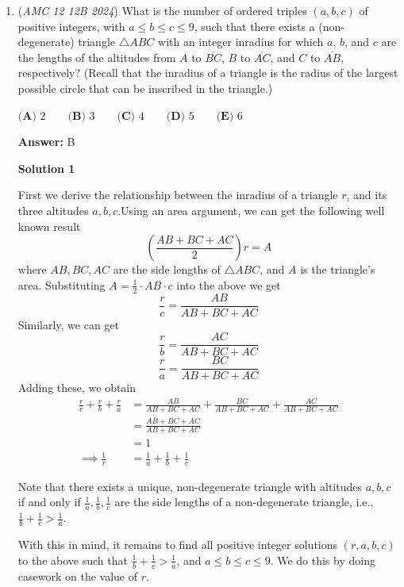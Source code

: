 \begin{enumerate}
 Yielding answer choice $\boxed{B}$.

 ==Only B and D looks normal , guess one using掐头去尾

 


	\item (\textit{AMC 12 12B 2024}) What is the number of ordered triples $(a,b,c)$ of positive integers, with $a\le b\le c\le 9$, such that there exists a (non-degenerate) triangle $\triangle ABC$ with an integer inradius for which $a$, $b$, and $c$ are the lengths of the altitudes from $A$ to $\overline{BC}$, $B$ to $\overline{AC}$, and $C$ to $\overline{AB}$, respectively? (Recall that the inradius of a triangle is the radius of the largest possible circle that can be inscribed in the triangle.)


 $\textbf{(A) }2\qquad \textbf{(B) }3\qquad \textbf{(C) }4\qquad \textbf{(D) }5\qquad \textbf{(E) }6\qquad$

 \textbf{Answer: }B



\textbf{Solution 1}

First we derive the relationship between the inradius of a triangle $r$, and its three altitudes $a, b, c$.Using an area argument, we can get the following well known result
 \[\left(\frac{AB+BC+AC}{2}\right)r=A\]where $AB, BC, AC$ are the side lengths of $\triangle ABC$, and $A$ is the triangle's area. Substituting $A=\frac{1}{2}\cdot AB\cdot c$ into the above we get
 \[\frac{r}{c}=\frac{AB}{AB+BC+AC}\]Similarly, we can get
 \[\frac{r}{b}=\frac{AC}{AB+BC+AC}\]
 \[\frac{r}{a}=\frac{BC}{AB+BC+AC}\]Adding these, we obtain\begin{align}\label{e1}\frac{r}{c} + \frac{r}{b} + \frac{r}{a} &= \frac{AB}{AB+BC+AC} + \frac{BC}{AB+BC+AC} + \frac{AC}{AB+BC+AC} \\&= \frac{AB+BC+AC}{AB+BC+AC} \\&= 1 \\\implies \frac{1}{r} &= \frac{1}{a}+\frac{1}{b}+\frac{1}{c}\end{align}

 Note that there exists a unique, non-degenerate triangle with altitudes $a, b, c$ if and only if $\frac{1}{a}, \frac{1}{b}, \frac{1}{c}$ are the side lengths of a non-degenerate triangle, i.e., $\frac{1}{b}+\frac{1}{c}>\frac{1}{a}$. 

 With this in mind, it remains to find all positive integer solutions $(r, a, b, c)$ to the above such that $\frac{1}{b}+\frac{1}{c}>\frac{1}{a}$, and $a\le b\le c\le 9$. We do this by doing casework on the value of $r$. 


\end{enumerate}

